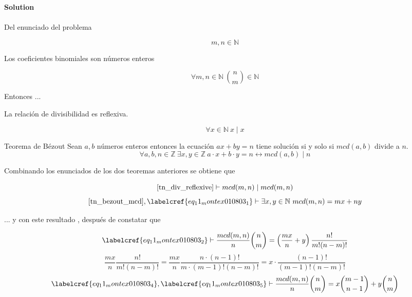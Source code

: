 \noindent\textbf{Solution } \\\\

Del enunciado del problema 

\begin{equation} \label{eq_11_montex010803_0a}
	m,n \in \mathbb{N}
\end{equation}

Los coeficientes binomiales son números enteros

\begin{equation} \label{eq_11_montex010803_0}
	\forall m,n \in \mathbb{N}\ {n \choose m} \in \mathbb{N}
\end{equation}

Entonces ...

\begin{theorem} \label{tn_div_reflexive}
	La relación de divisibilidad es reflexiva.
	
	\begin{equation} \label{eq_tn_div_reflexive}
		\forall x \in \mathbb{N}\ x \mid x
	\end{equation}
\end{theorem}

\begin{theorem} \label{tn_bezout_mcd} Teorema de Bézout
	Sean $a, b$ números enteros entonces la ecuación $ax + by = n$ tiene solución si y solo si $mcd(a,b)$ divide a $n$.
	\begin{equation} \label{eq_tn_bezout_mcd}
		\forall a,b,n \in \mathbb{Z}\ \exists x,y \in \mathbb{Z}\ a \cdot x+b \cdot y = n \leftrightarrow mcd(a,b) \mid n
	\end{equation}
\end{theorem}

Combinando los enunciados de los dos teoremas anteriores se obtiene que

\begin{equation} \label{eq_11_montex010803_1}
	\cref{tn_div_reflexive} \vdash mcd(m,n) \mid mcd(m,n)
\end{equation}
\begin{equation} \label{eq_11_montex010803_2}
	\cref{tn_bezout_mcd}, \labelcref{eq_11_montex010803_1} \vdash \exists x,y \in \mathbb{N}\ mcd(m,n) = mx + ny
\end{equation}

... y con este resultado , después de constatar que 

\begin{equation} \label{eq_11_montex010803_3}
	\labelcref{eq_11_montex010803_2} \vdash \frac{mcd(m,n)}{n}{n \choose m} = \left(\frac{mx}{n} + y\right) \frac{n!}{m! (n-m)!}
\end{equation}
\begin{equation} \label{eq_11_montex010803_4}
	\frac{mx}{n} \frac{n!}{m! (n-m)!} = \frac{mx}{n} \frac{n \cdot (n-1)!}{m \cdot (m-1)! (n-m)!} = x \cdot \frac{(n-1)!}{(m-1)!(n-m)!}
\end{equation}
\begin{equation} \label{eq_11_montex010803_5}
	\labelcref{eq_11_montex010803_4}, \labelcref{eq_11_montex010803_5} \vdash \frac{mcd(m,n)}{n} {n \choose m} = x {{m-1} \choose {n-1}} + y {n \choose m}
\end{equation}

